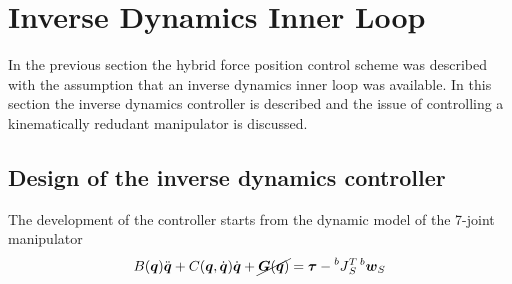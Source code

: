 \section{Inverse Dynamics Inner Loop}\label{sec:invdyn}
In the previous section the hybrid force position control scheme was described
with the assumption that an inverse dynamics inner loop was available. In this
section the inverse dynamics controller is described and the issue of controlling
a kinematically redudant manipulator is discussed.

\subsection{Design of the inverse dynamics controller}
The development of the controller starts from the dynamic model of the 7-joint
manipulator
\begin{equation}\label{eq:joint_space_dyn}
  B(\vec{q}) \ddot{\vec{q}} + C(\vec{q}, \dot{\vec{q}}) \dot{\vec{q}} + \cancel{\vec{G}(\vec{q})} = \vec{\tau}
  -\prescript{b}{}{J}^{T}_{S} \prescript{b}{}{\vec{w}}_{S}
\end{equation}

